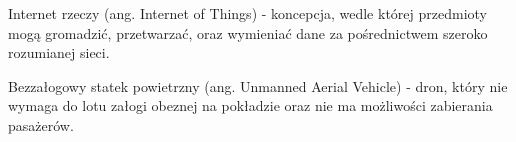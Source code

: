 \suppressfloats[t]

\begin{description}[\setleftmargin{65pt}\setlabelstyle{\bfseries}]
    \leftskip=1cm
    \item[IoT] Internet rzeczy (ang. Internet of Things) - koncepcja, wedle której przedmioty mogą gromadzić, przetwarzać, oraz wymieniać dane za pośrednictwem szeroko rozumianej sieci.
    \item[UAV] Bezzałogowy statek powietrzny (ang. Unmanned Aerial Vehicle) - dron, który nie wymaga do lotu załogi obeznej na pokładzie oraz nie ma możliwości zabierania pasażerów.
\end{description}

